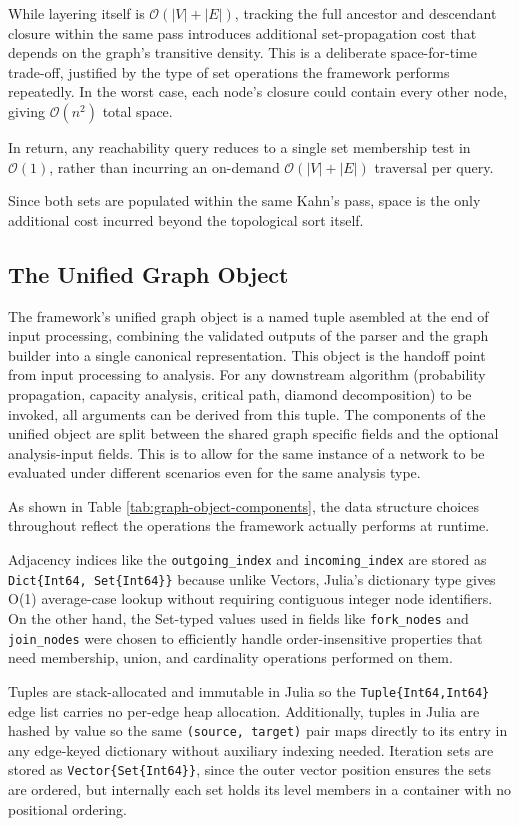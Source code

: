\documentclass[12pt]{report}
\begin{document}
While layering itself is $\mathcal{O}(|V|+|E|)$, tracking the full ancestor and descendant closure within the same pass introduces additional set-propagation cost that depends on the graph's transitive density.
This is a deliberate space-for-time trade-off, justified by the type of set operations the framework performs repeatedly. In the worst case, each node's closure could contain every other node, giving  $\mathcal{O}(n^2)$ total space. 

In return, any reachability query reduces to a single set membership test in $\mathcal{O}(1)$, rather than incurring an on-demand $\mathcal{O}(|V|+|E|)$ traversal per query.

Since both sets are populated within the same Kahn's pass, space is the only additional cost incurred beyond the topological sort itself.


\subsection{The Unified Graph Object}
The framework's unified graph object is a named tuple asembled at the end of input processing, combining the validated outputs of the parser and the graph builder into a single canonical representation. This object is the handoff point from input processing to analysis. For any downstream algorithm (probability propagation, capacity analysis, critical path, diamond decomposition)  to be invoked, all arguments can be derived from this tuple. 
The components of the unified object are split between the shared graph specific fields and the optional analysis-input fields. This is to allow for the same instance of a network to be evaluated under different scenarios even for the same analysis type. 

As shown in Table \ref{tab:graph-object-components}, the data structure choices throughout reflect the operations the framework actually performs at runtime.

Adjacency indices like the \texttt{outgoing\_index} and \texttt{incoming\_index} are stored as \texttt{Dict\{Int64, Set\{Int64\}\}} because unlike Vectors, Julia's dictionary type gives O(1) average-case lookup without requiring contiguous integer node identifiers. On the other hand, the Set-typed values used in fields like \texttt{fork\_nodes} and \texttt{join\_nodes} were chosen to efficiently handle order-insensitive properties that need membership, union, and cardinality operations performed on them.

Tuples are stack-allocated and immutable in Julia so the \texttt{Tuple\{Int64,Int64\}} edge list carries no per-edge heap allocation. Additionally, tuples in Julia are hashed by value so the same \texttt{(source, target)} pair maps directly to its entry in any edge-keyed dictionary without auxiliary indexing needed. Iteration sets are stored as \texttt{Vector\{Set\{Int64\}\}}, since the outer vector position ensures the sets are ordered, but internally each set holds its level members in a container with no positional ordering.
\end{document}
